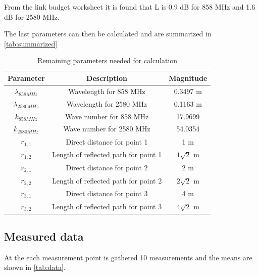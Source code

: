 From the link budget worksheet it is found that L is 0.9 dB for 858 MHz and 1.6 dB for 2580 MHz.

The last parameters can then be calculated and are summarized in \autoref{tab:summarized}

\begin{table}[H]
\centering
\begin{tabular}{|c|c|c|}\hline
\textbf{Parameter}	&\textbf{Description}		&\textbf{Magnitude}	\\\hline
$\lambda_{858MHz}$	& Wavelength for 858 MHz				&0.3497 m			\\\hline
$\lambda_{2580MHz}$	& Wavelength for 2580 MHz				&0.1163 m			\\\hline
$k_{858MHz}$		& Wave number for 858 MHz				&17.9699			\\\hline
$k_{2580MHz}$		& Wave number for 2580 MHz				&54.0354			\\\hline
$r_{1,1}$			& Direct distance for point 1			&1 m				\\\hline
$r_{1,2}$			& Length of reflected path  for point 1	&$1\sqrt{2}$ m		\\\hline
$r_{2,1}$			& Direct distance  for point 2			&2 m				\\\hline
$r_{2,2}$			& Length of reflected path for point 2	&$2\sqrt{2}$ m		\\\hline
$r_{3,1}$			& Direct distance  for point 3			&4 m				\\\hline
$r_{3,2}$			& Length of reflected path for point 3	&$4\sqrt{2}$ m		\\\hline
\end{tabular}
\caption{Remaining parameters needed for calculation}
\label{tab:summarized}
\end{table}

\subsection{Measured data}

At the each measurement point is gathered 10 measurements and the means are shown in \autoref{tab:data}.

